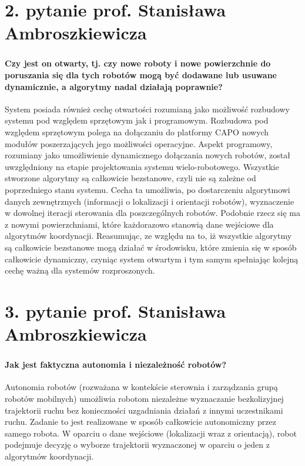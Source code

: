 \section*{2. pytanie prof. Stanisława Ambroszkiewicza}
\begin{frame}
\frametitle{\secname}
\framesubtitle{Czy jest on otwarty, tj. czy nowe roboty i nowe powierzchnie do poruszania się dla tych robotów mogą być dodawane lub usuwane dynamicznie, a algorytmy nadal działają poprawnie?}

\tiny

System posiada również cechę otwartości rozumianą jako możliwość rozbudowy systemu pod względem sprzętowym jak i programowym. Rozbudowa pod względem sprzętowym polega na dołączaniu do platformy CAPO nowych modułów poszerzających jego możliwości operacyjne. 
\newline
\newline
Aspekt programowy, rozumiany jako umożliwienie dynamicznego dołączania nowych robotów, został uwzględniony na etapie projektowania systemu wielo-robotowego. Wszystkie stworzone algorytmy są całkowicie bezstanowe, czyli nie są zależne od poprzedniego stanu systemu. Cecha ta umożliwia, po dostarczeniu algorytmowi danych zewnętrznych (informacji o lokalizacji i orientacji robotów), wyznaczenie w dowolnej iteracji sterowania dla poszczególnych robotów. Podobnie rzecz się ma z nowymi powierzchniami, które każdorazowo stanowią dane wejściowe dla algorytmów koordynacji. 
\newline
\newline
Reasumując, ze względu na to, iż wszystkie algorytmy są całkowicie bezstanowe mogą działać w środowisku, które zmienia się w sposób całkowicie dynamiczny, czyniąc system otwartym i tym samym spełniając kolejną cechę ważną dla systemów rozproszonych.  

\end{frame}


\section*{3. pytanie prof. Stanisława Ambroszkiewicza}
\begin{frame}
\frametitle{\secname}
\framesubtitle{Jak jest faktyczna autonomia i niezależność robotów?}
\scriptsize

Autonomia robotów (rozważana w kontekście sterownia i zarządzania grupą robotów mobilnych) umożliwia robotom niezależne wyznaczanie bezkolizyjnej trajektorii ruchu bez konieczności uzgadniania działań z innymi uczestnikami ruchu. Zadanie to jest realizowane w sposób całkowicie autonomiczny przez samego robota.  W oparciu o dane wejściowe (lokalizacji wraz z orientacją), robot podejmuje decyzję o wyborze trajektorii wyznaczonej w oparciu o jeden z algorytmów koordynacji.

\end{frame}


